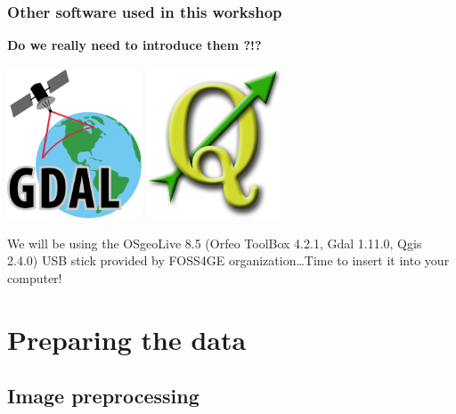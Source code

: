 \documentclass[8pt]{beamer}
\begin{document}
\begin{frame}
\frametitle{Other software used in this workshop}

\textbf{Do we really need to introduce them ?!?}

\begin{center}
\href{http://gdal.org/}{\includegraphics[width=0.3\textwidth]{images/gdal.png}} \quad \href{http://qgis.org/en/site/}{\includegraphics[width=0.3\textwidth]{images/qgis.png}}
\end{center}

We will be using the OSgeoLive 8.5 (Orfeo ToolBox 4.2.1, Gdal 1.11.0, Qgis 2.4.0) USB stick provided by FOSS4GE organization\ldots Time to insert it into your computer! 

\end{frame}


\section{Preparing the data}


\subsection{Image preprocessing}
\end{document}
